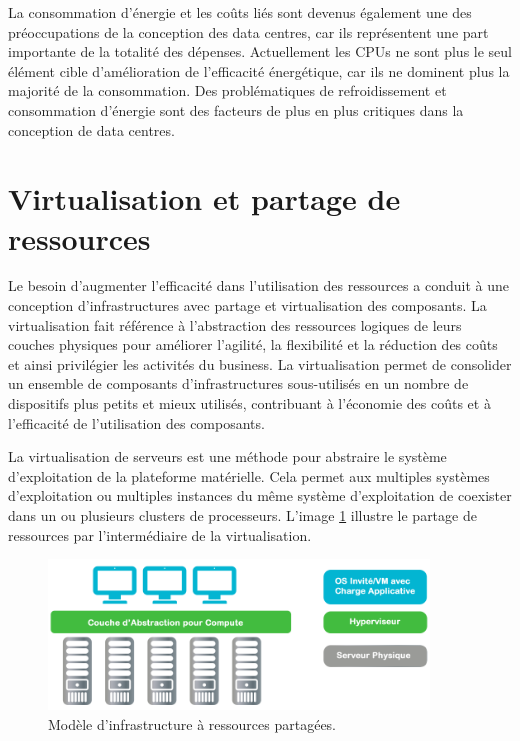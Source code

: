 La consommation d'énergie et les coûts liés sont devenus également une des préoccupations de la conception des data centres, car ils représentent une part importante de la totalité des dépenses. Actuellement les CPUs ne sont plus le seul élément cible d'amélioration de l'efficacité énergétique, car ils ne dominent plus la majorité de la consommation. Des problématiques de refroidissement et consommation d'énergie sont des facteurs de plus en plus critiques dans la conception de data centres.\cite{datacenterAsComputerIntro} \cite{dataCenterEvolution}

\section{Virtualisation et partage de ressources}

Le besoin d'augmenter l'efficacité dans l'utilisation des ressources a conduit à une conception d'infrastructures avec partage et virtualisation des composants. La virtualisation fait référence à l'abstraction des ressources logiques de leurs couches physiques pour améliorer l'agilité, la flexibilité et la réduction des coûts et ainsi privilégier les activités du business. La virtualisation permet de consolider un ensemble de composants d'infrastructures sous-utilisés en un nombre de dispositifs plus petits et mieux utilisés, contribuant à l'économie des coûts et à l'efficacité de l'utilisation des composants.

La virtualisation de serveurs est une méthode pour abstraire le système d'exploitation de la plateforme matérielle. Cela permet aux multiples systèmes d'exploitation ou multiples instances du même système d'exploitation de coexister dans un ou plusieurs clusters de processeurs. L'image \ref{virtinfra} illustre le partage de ressources par l'intermédiaire de la virtualisation.\\

\begin{figure}[h]
\begin{center}
\includegraphics[width=0.9\textwidth]{images/shared_infa_virt_T} 
\caption{Modèle d'infrastructure à ressources partagées. \cite{journeySDDC}}\label{virtinfra}
\end{center}
\end{figure}

